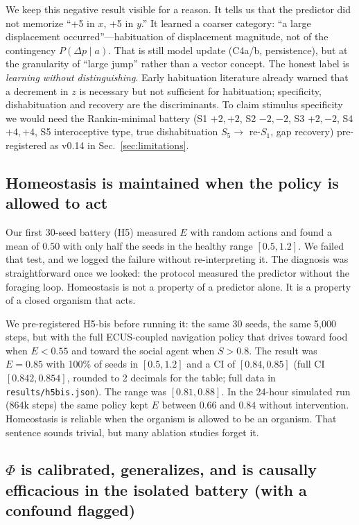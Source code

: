 \documentclass[11pt,a4paper]{article}
\begin{document}
We keep this negative result visible for a reason. It tells us that the predictor did not memorize ``+5 in $x$, +5 in $y$.'' It learned a coarser category: ``a large displacement occurred''---habituation of displacement magnitude, not of the contingency $P(\Delta p\mid a)$. That is still model update (C4a/b, persistence), but at the granularity of ``large jump'' rather than a vector concept. The honest label is \textit{learning without distinguishing}. Early habituation literature already warned that a decrement in $z$ is necessary but not sufficient for habituation; specificity, dishabituation and recovery are the discriminants. To claim stimulus specificity we would need the Rankin-minimal battery (S1 $+2,+2$, S2 $-2,-2$, S3 $+2,-2$, S4 $+4,+4$, S5 interoceptive type, true dishabituation $S_5\rightarrow$ re-$S_1$, gap recovery) pre-registered as v0.14 in Sec.~\ref{sec:limitations}.

\subsection{Homeostasis is maintained when the policy is allowed to act}

Our first 30-seed battery (H5) measured $E$ with random actions and found a mean of $0.50$ with only half the seeds in the healthy range $[0.5, 1.2]$. We failed that test, and we logged the failure without re-interpreting it. The diagnosis was straightforward once we looked: the protocol measured the predictor without the foraging loop. Homeostasis is not a property of a predictor alone. It is a property of a closed organism that acts.

We pre-registered H5-bis before running it: the same 30 seeds, the same 5,000 steps, but with the full ECUS-coupled navigation policy that drives toward food when $E<0.55$ and toward the social agent when $S>0.8$. The result was $E=0.85$ with 100\% of seeds in $[0.5,1.2]$ and a CI of $[0.84,0.85]$ (full CI $[0.842,0.854]$, rounded to 2 decimals for the table; full data in \texttt{results/h5bis.json}). The range was $[0.81,0.88]$. In the 24-hour simulated run (864k steps) the same policy kept $E$ between $0.66$ and $0.84$ without intervention. Homeostasis is reliable when the organism is allowed to be an organism. That sentence sounds trivial, but many ablation studies forget it.

\subsection{\texorpdfstring{$\Phi$}{Phi} is calibrated, generalizes, and is causally efficacious in the isolated battery (with a confound flagged)}
\end{document}

